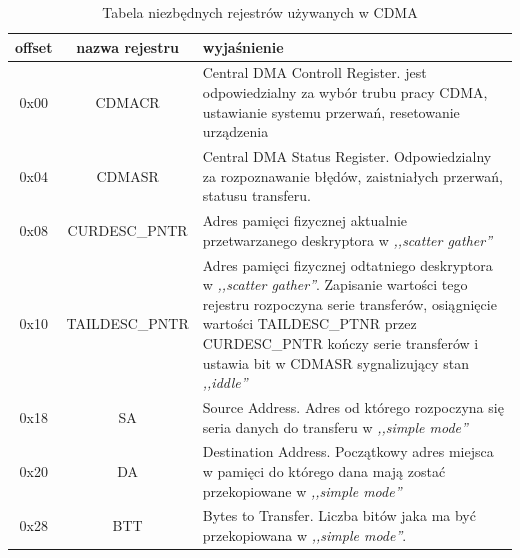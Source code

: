 \begin{table}[h]
    \begin{center}
    \caption{Tabela niezbędnych rejestrów używanych w CDMA}
    \label{tab:cdmareg}

    \begin{tabularx}{\textwidth}{|c|c|X|}
        \hline
        offset & nazwa rejestru & wyjaśnienie \\ \hline

        0x00   & CDMACR         & Central DMA Controll Register.
                                    jest odpowiedzialny za wybór trubu pracy CDMA,
                                    ustawianie systemu przerwań, resetowanie urządzenia \\ \hline

        0x04  & CDMASR          & Central DMA Status Register. Odpowiedzialny za rozpoznawanie
                               błędów, zaistniałych przerwań, statusu transferu. \\ \hline

        0x08 & CURDESC\_PNTR & Adres pamięci fizycznej aktualnie przetwarzanego deskryptora w \textit{,,scatter gather''} \\ \hline

        0x10 & TAILDESC\_PNTR & Adres pamięci fizycznej odtatniego deskryptora w \textit{,,scatter gather''}. Zapisanie wartości tego
                                rejestru rozpoczyna serie transferów, osiągnięcie wartości TAILDESC\_PTNR przez CURDESC\_PNTR kończy
                                serie transferów i ustawia bit w CDMASR sygnalizujący stan \textit{,,iddle''} \\ \hline

        0x18  & SA              & Source Address. Adres od którego rozpoczyna się seria danych
                                  do transferu w \textit{,,simple mode''} \\ \hline

        0x20   & DA             &  Destination Address. Początkowy adres miejsca w pamięci do którego
                                   dana mają zostać przekopiowane w \textit{,,simple mode''} \\ \hline

        0x28 &        BTT       &  Bytes to Transfer. Liczba bitów jaka ma być przekopiowana w \textit{,,simple mode''}. \\ \hline
    \end{tabularx}
\end{center}
\end{table}


